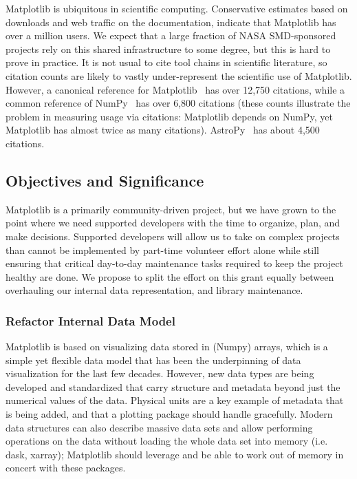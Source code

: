 \documentclass[12pt]{article}
\numberwithin{page}{section}
\begin{document}
Matplotlib is ubiquitous in scientific computing.  Conservative estimates based on downloads and web traffic on the documentation, indicate that Matplotlib has over a
million users.  We expect that a large fraction of NASA SMD-sponsored
projects rely on this shared infrastructure to some degree, but this
is hard to prove in practice.  It is not usual to cite tool chains in scientific literature, so citation counts are likely to
vastly under-represent the scientific use of Matplotlib.  However, a
canonical reference for Matplotlib~\cite{Hunter:2007} has over 12,750
citations, while a common reference of NumPy~\cite{walt2011numpy} has
over 6,800 citations (these counts illustrate the problem in
measuring usage via citations: Matplotlib depends on
NumPy, yet Matplotlib has almost twice as many citations).
AstroPy~\cite{robitaille2013astropy} has about 4,500 citations.

\subsection{Objectives and Significance}





Matplotlib is a primarily community-driven project, but we have grown
to the point where we need supported developers with the time to
organize, plan, and make decisions.  Supported developers will allow
us to take on complex projects than cannot be implemented by part-time volunteer
effort alone while still ensuring that critical day-to-day maintenance
tasks required to keep the project healthy are done.  We propose to
split the effort on this grant equally between overhauling our internal data representation, and library maintenance.


\subsubsection{Refactor Internal Data Model}

Matplotlib is based on visualizing data stored in (Numpy) arrays,
which is a simple yet flexible data model that has been the
underpinning of data visualization for the last few decades.  However,
new data types are being developed and standardized that carry
structure and metadata beyond just the numerical values of the data.
Physical units are a key example of metadata that is being added, and
that a plotting package should handle gracefully.  Modern data
structures can also describe massive data sets and allow performing
operations on the data without loading the whole data set into memory
(i.e. dask, xarray); Matplotlib should leverage and be able to work
out of memory in concert with these packages.
\end{document}
